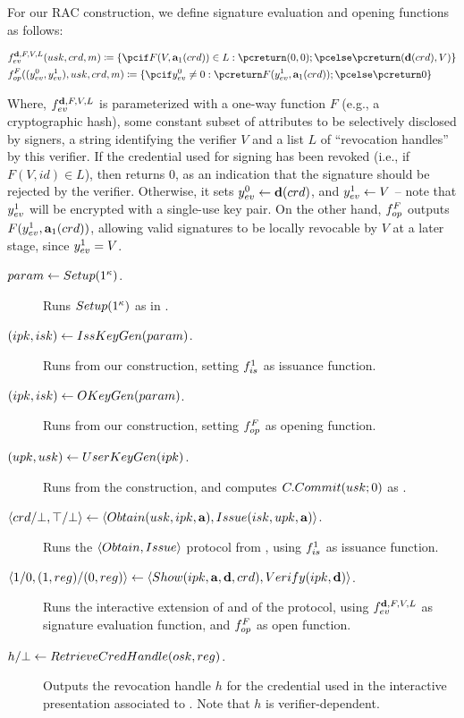 For our RAC construction, we define signature evaluation and opening functions
as follows:

\begin{align}
  & \feval^{\dattrs,F,V,L}(\usk,\cred,\msg) \coloneqq
    \lbrace
    \pcif F(V,\attrs_1(\cred)) \in L: \pcreturn (0,0);
    \pcelse \pcreturn (\dattrs(\cred),V)
    \rbrace \nonumber \\
  & \finsp^{F}((\yeval^0,\yeval^1),\usk,\cred,\msg) \coloneqq
    \lbrace
    \pcif \yeval^0 \neq 0: \pcreturn F(\yeval^1,\attrs_1(\cred));
    \pcelse \pcreturn 0
     \rbrace
  \label{eq:funcs-rac}
\end{align}

Where, $f_{ev}^{\mathbf{d},F,V,L}$ is parameterized with a one-way function $F$
(e.g., a cryptographic hash), some constant subset \dattrs of attributes to be
selectively disclosed by signers, a string identifying the verifier $V$ and a
list $L$ of ``revocation handles'' by this verifier. If the credential used for
signing has been revoked (i.e., if $F(V,id) \in L$), then \feval returns $0$, as
an indication that the signature should be rejected by the verifier. Otherwise,
it sets $y_{ev}^0 \gets \mathbf{d}(crd)$, and $y_{ev}^1 \gets V$ -- note that
$y_{ev}^1$ will be encrypted with a single-use key pair.
%
On the other hand, $f_{op}^{F}$ outputs $F(y_{ev}^1,\mathbf{a}_1(crd))$, allowing
valid signatures to be locally revocable by $V$ at a later stage, since
$y_{ev}^1=V$.

\begin{description}
\item[$param \gets Setup(1^\kappa)$.] Runs $Setup(1^\kappa)$ as in
  \CUASGen.
\item[$(ipk,isk) \gets IssKeyGen(param)$.] Runs \IKeyGen from our
  \CUASGen construction, setting $f_{is}^1$ as issuance function.
\item[$(ipk,isk) \gets OKeyGen(param)$.] Runs \OKeyGen from our
  \CUASGen construction, setting $f_{op}^F$ as opening function.
\item[$(upk,usk) \gets UserKeyGen(ipk)$.] Runs \UKeyGen from the
  \CUASGen construction, and computes $C.Commit(usk;0)$ as \upk.
\item[$\langle crd/\bot,\top/\bot \rangle \gets
  \langle Obtain(usk,ipk,\mathbf{a}),Issue(isk,upk,\mathbf{a}) \rangle$.]
  Runs the $\langle Obtain,Issue \rangle$ protocol from \CUASGen, using
  $f_{is}^1$ as issuance function.
\item[$\langle 1/0,(1,reg)/(0,reg)\rangle \gets \langle Show(ipk,\mathbf{a},\mathbf{d},crd),
  Verify(ipk,\mathbf{d}) \rangle$.]
  Runs the interactive extension of \Sign and \Verify of the \CUASGen protocol,
  using $f_{ev}^{\mathbf{d},F,V,L}$ as signature evaluation function, and
  $f_{op}^F$ as open function.
\item[$h/\bot \gets RetrieveCredHandle(osk,reg)$.]
  Outputs the revocation handle $h$ for the credential used in the interactive
  presentation associated to \utrans. Note that $h$ is verifier-dependent.
\end{description}

